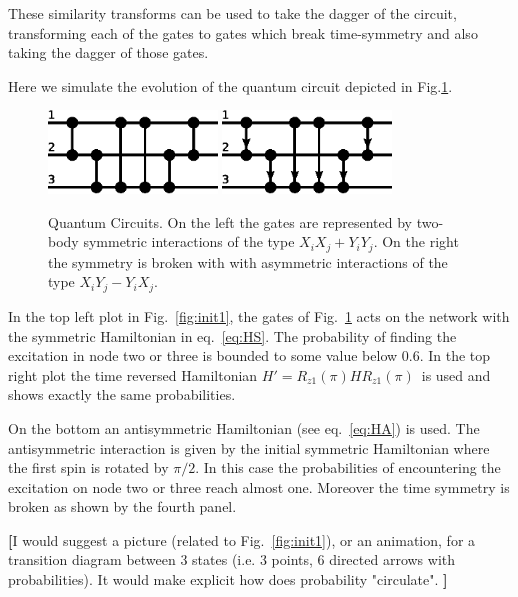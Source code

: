 \documentclass[aps,pra,12pt,nofootinbib,superscriptaddress,longbibliography,showpacs]{revtex4-1}
\newcommand{\yo}[1]{\textcolor{dblue}{\textbf{[}#1\textbf{]}}}
\theoremstyle{plain}
\theoremstyle{definition}
\begin{document}
These similarity transforms can be used to take the dagger of the circuit,
transforming each of the gates to gates which break time-symmetry and also
taking the dagger of those gates.  




Here we simulate the evolution of the quantum circuit depicted in
Fig.\ref{fig:qcircuit}.

\begin{figure}[h]
  \centering
  \includegraphics[width=0.4\textwidth]{gates1}
  \hfill
  \includegraphics[width=0.4\textwidth]{gates2}
  \caption{Quantum Circuits.
  On the left the gates are represented by two-body symmetric interactions of
  the type $X_iX_j+Y_iY_j$.
  On the right the symmetry is broken with with asymmetric interactions of the
  type $X_iY_j-Y_iX_j$.}
  \label{fig:qcircuit}
\end{figure}

In the top left plot in Fig.~\ref{fig:init1},
the gates of Fig.~\ref{fig:qcircuit} acts on the network with the symmetric
Hamiltonian in eq.~\ref{eq:HS}.
The probability of finding the excitation in node two or three is bounded to
some value below 0.6.
In the top right plot the time reversed Hamiltonian
$H'=R_{z1}(\pi)HR_{z1}(\pi)$~is used and shows exactly the same
probabilities.

On the bottom an antisymmetric Hamiltonian (see eq.~\ref{eq:HA}) is used. 
The antisymmetric interaction is given by the initial symmetric Hamiltonian
where the first spin is rotated by $\pi/2$.
In this case the probabilities of encountering the excitation on node two or
three reach almost one.
Moreover the time symmetry is broken as shown by the fourth panel.

\yo{I would suggest a picture (related to Fig.~\ref{fig:init1}), or an
animation,
for a transition diagram between 3 states
(i.e. 3 points, 6 directed arrows with probabilities).
It would make explicit how does probability "circulate". }
\end{document}
